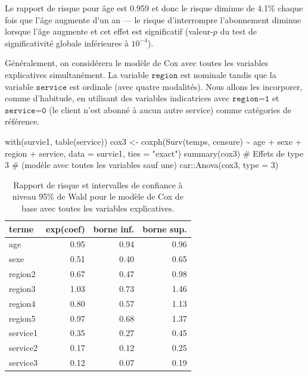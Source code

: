 \documentclass[
  11pt,
  letterpaper,
]{book}
\newenvironment{Shaded}{\begin{snugshade}}{\end{snugshade}}
\newcommand{\AttributeTok}[1]{\textcolor[rgb]{0.40,0.45,0.13}{#1}}
\newcommand{\CommentTok}[1]{\textcolor[rgb]{0.37,0.37,0.37}{#1}}
\newcommand{\DecValTok}[1]{\textcolor[rgb]{0.68,0.00,0.00}{#1}}
\newcommand{\FunctionTok}[1]{\textcolor[rgb]{0.28,0.35,0.67}{#1}}
\newcommand{\NormalTok}[1]{\textcolor[rgb]{0.00,0.23,0.31}{#1}}
\newcommand{\OtherTok}[1]{\textcolor[rgb]{0.00,0.23,0.31}{#1}}
\newcommand{\SpecialCharTok}[1]{\textcolor[rgb]{0.37,0.37,0.37}{#1}}
\newcommand{\StringTok}[1]{\textcolor[rgb]{0.13,0.47,0.30}{#1}}
\theoremstyle{definition}
\theoremstyle{remark}
\begin{document}
Le rapport de risque pour âge est 0.959 et donc le risque diminue de
4.1\% chaque fois que l'âge augmente d'un an --- le risque d'interrompre
l'abonnement diminue lorsque l'âge augmente et cet effet est
significatif (valeur-\(p\) du test de significativité globale
inférieures à \(10^{-4}\)).

Généralement, on considérera le modèle de Cox avec toutes les variables
explicatives simultanément. La variable \(\texttt{region}\) est nominale
tandis que la variable \(\texttt{service}\) est ordinale (avec quatre
modalités). Nous allons les incorporer, comme d'habitude, en utilisant
des variables indicatrices avec \(\texttt{region=1}\) et
\(\texttt{service=0}\) (le client n'est abonné à aucun autre service)
comme catégories de référence.

\begin{Shaded}
\begin{Highlighting}[]
\FunctionTok{with}\NormalTok{(survie1, }\FunctionTok{table}\NormalTok{(service))}
\NormalTok{cox3 }\OtherTok{\textless{}{-}} \FunctionTok{coxph}\NormalTok{(}\FunctionTok{Surv}\NormalTok{(temps, censure) }\SpecialCharTok{\textasciitilde{}} 
\NormalTok{                age }\SpecialCharTok{+}\NormalTok{ sexe }\SpecialCharTok{+}\NormalTok{ region }\SpecialCharTok{+}\NormalTok{ service, }
              \AttributeTok{data =}\NormalTok{ survie1, }
              \AttributeTok{ties =} \StringTok{"exact"}\NormalTok{)}
\FunctionTok{summary}\NormalTok{(cox3)}
\CommentTok{\# Effets de type 3 }
\CommentTok{\# (modèle avec toutes les variables sauf une)}
\NormalTok{car}\SpecialCharTok{::}\FunctionTok{Anova}\NormalTok{(cox3, }
           \AttributeTok{type =} \DecValTok{3}\NormalTok{)}
\end{Highlighting}
\end{Shaded}

\hypertarget{tbl-survie5-coefs}{}
\begin{table}
\caption{\label{tbl-survie5-coefs}Rapport de risque et intervalles de confiance à niveau 95\% de Wald pour
le modèle de Cox de base avec toutes les variables explicatives. }\tabularnewline

\centering
\begin{tabular}{lrrr}
\toprule
terme & exp(coef) & borne inf. & borne sup.\\
\midrule
age & 0.95 & 0.94 & 0.96\\
sexe & 0.51 & 0.40 & 0.65\\
region2 & 0.67 & 0.47 & 0.98\\
region3 & 1.03 & 0.73 & 1.46\\
region4 & 0.80 & 0.57 & 1.13\\
\addlinespace
region5 & 0.97 & 0.68 & 1.37\\
service1 & 0.35 & 0.27 & 0.45\\
service2 & 0.17 & 0.12 & 0.25\\
service3 & 0.12 & 0.07 & 0.19\\
\bottomrule
\end{tabular}
\end{table}
\end{document}
